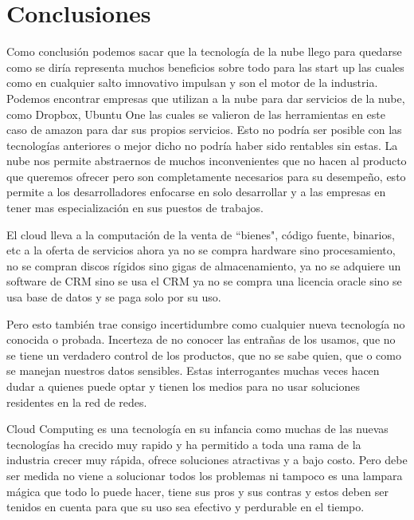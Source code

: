 \documentclass[12pt,a4paper]{article}
\begin{document}
\section{Conclusiones}
Como conclusión podemos sacar que la tecnología de la nube llego para quedarse como se diría 
representa muchos beneficios sobre todo para las start up las cuales como en cualquier salto 
imnovativo impulsan y son el motor de la industria. Podemos encontrar empresas que utilizan a la nube
para dar servicios de la nube, como Dropbox, Ubuntu One las cuales se valieron de las herramientas
en este caso de amazon para dar sus propios servicios. Esto no podría ser posible con las tecnologías
anteriores o mejor dicho no podría haber sido rentables sin estas. La nube nos permite abstraernos de
muchos inconvenientes que no hacen al producto que queremos ofrecer pero son completamente necesarios
para su desempeño, esto permite a los desarrolladores enfocarse en solo desarrollar y a las empresas
en tener mas especialización en sus puestos de trabajos.\par
El cloud lleva a la computación de la venta de ``bienes", código fuente, binarios, etc a la oferta de
servicios ahora ya no se compra hardware sino procesamiento, no se compran discos rígidos sino gigas 
de almacenamiento, ya no se adquiere un software de CRM sino se usa el CRM ya no se compra una 
licencia oracle sino se usa base de datos y se paga solo por su uso.\par
Pero esto también trae consigo incertidumbre como cualquier nueva tecnología no conocida o probada. 
Incerteza de no conocer las entrañas de los usamos, que no se tiene un verdadero control de los 
productos, que no se sabe quien, que o como se manejan nuestros datos sensibles. Estas interrogantes 
muchas veces hacen dudar a quienes puede optar y tienen los medios para no usar soluciones residentes 
en la red de redes.\par
Cloud Computing es una tecnología en su infancia como muchas de las nuevas tecnologías ha crecido muy
rapido y ha permitido a toda una rama de la industria crecer muy rápida, ofrece soluciones atractivas
y a bajo costo. Pero debe ser medida no viene a solucionar todos los problemas ni tampoco es una
lampara mágica que todo lo puede hacer, tiene sus pros y sus contras y estos deben ser tenidos en 
cuenta para que su uso sea efectivo y perdurable en el tiempo.

\newpage
\end{document}
